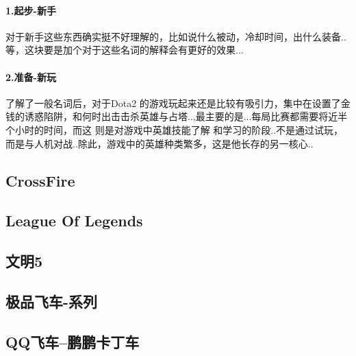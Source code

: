 \documentclass[UTF8,a4paper,8pt]{ctexart}
\begin{document}
		\paragraph{1.起步-新手} 对于新手这些东西确实挺不好理解的，比如说什么被动，冷却时间，出什么装备..等，这块要是加个对于这些名词的解释会有更好的效果...
		
		\paragraph{2.准备-新玩} 了解了一般名词后，对于Dota2 的游戏玩起来还是比较有吸引力，集中在设置了金钱的诱惑陷阱，和何时出击击杀英雄与占塔..,最主要的是...每局比赛都需要将近半个小时的时间，而这 则是对游戏中英雄技能了解 和学习的阶段..不是通过试玩，而是与人机对战..除此，游戏中的英雄种类繁多，这是他长存的另一核心..
	
	\subsection{CrossFire}
	
	\subsection{League Of Legends}
	
	\subsection{文明5}	
    
    \subsection{极品飞车-系列} 
     
    \subsection{QQ飞车--鹏鹏卡丁车}
    
    
    
    
\end{document}
